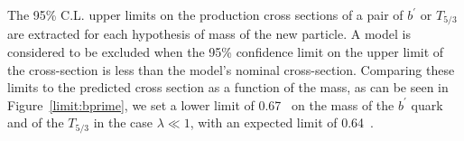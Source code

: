 

The 95\% C.L. upper limits on the production cross sections of a pair of $b^\prime$ or $T_{5/3}$ are extracted for each hypothesis of mass of the new particle.
A model is considered to be excluded when the 95\% confidence limit on the upper limit of the cross-section is less than the model's nominal cross-section.
Comparing these limits to the predicted cross section as a function of the mass, as can be seen in Figure~\ref{limit:bprime}, we set a lower limit of 0.67~\TeV{} on the mass of the $b^\prime$ quark and of the $T_{5/3}$ in the case $\lambda\ll1$, with an expected limit of 0.64~\TeV{}.


